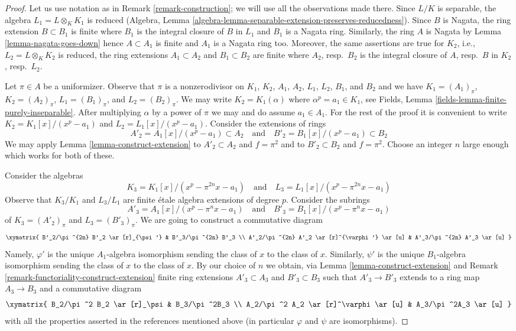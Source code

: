 \begin{proof}
Let us use notation as in Remark \ref{remark-construction}; we will use all
the observations made there. Since $L/K$ is separable, the algebra
$L_1 = L \otimes_K K_1$ is reduced
(Algebra, Lemma \ref{algebra-lemma-separable-extension-preserves-reducedness}).
Since $B$ is Nagata, the ring extension $B \subset B_1$ is finite
where $B_1$ is the integral closure of $B$ in $L_1$
and $B_1$ is a Nagata ring. Similarly, the ring $A$ is Nagata by
Lemma \ref{lemma-nagata-goes-down} hence $A \subset A_1$ is finite
and $A_1$ is a Nagata ring too. Moreover, the same assertions are true
for $K_2$, i.e., $L_2 = L \otimes_K K_2$ is reduced,
the ring extensions $A_1 \subset A_2$ and $B_1 \subset B_2$
are finite where $A_2$, resp.\ $B_2$ is the integral closure of
$A$, resp.\ $B$ in $K_2$, resp.\ $L_2$.

\medskip\noindent
Let $\pi \in A$ be a uniformizer. Observe that $\pi$ is a nonzerodivisor
on $K_1$, $K_2$, $A_1$, $A_2$, $L_1$, $L_2$, $B_1$, and $B_2$ and we have
$K_1 = (A_1)_\pi$, $K_2 = (A_2)_\pi$, $L_1 = (B_1)_\pi$, and $L_2 = (B_2)_\pi$.
We may write $K_2 = K_1(\alpha)$ where $\alpha^p = a_1 \in K_1$, see
Fields, Lemma \ref{fields-lemma-finite-purely-inseparable}.
After multiplying $\alpha$ by a power of $\pi$ we may and do assume
$a_1 \in A_1$. For the rest of the proof it is convenient to write
$K_2 = K_1[x]/(x^p - a_1)$ and $L_2 = L_1[x]/(x^p - a_1)$.
Consider the extensions of rings
$$
A'_2 = A_1[x]/(x^p - a_1) \subset A_2
\quad\text{and}\quad
B'_2 = B_1[x]/(x^p - a_1) \subset B_2
$$
We may apply Lemma \ref{lemma-construct-extension} to
$A'_2 \subset A_2$ and $f = \pi^2$ and to $B'_2 \subset B_2$ and $f = \pi^2$.
Choose an integer $n$ large enough which works for both of these.

\medskip\noindent
Consider the algebras
$$
K_3 = K_1[x]/(x^p - \pi^{2n} x - a_1)
\quad\text{and}\quad
L_3 = L_1[x]/(x^p - \pi^{2n} x - a_1)
$$
Observe that $K_3/K_1$ and $L_3/L_1$ are finite \'etale algebra extensions of
degree $p$. Consider the subrings
$$
A'_3 = A_1[x]/(x^p - \pi^n x - a_1)
\quad\text{and}\quad
B'_3 = B_1[x]/(x^p - \pi^n x - a_1)
$$
of $K_3 = (A'_2)_\pi$ and $L_3 = (B'_3)_\pi$. We are going to construct
a commutative diagram
$$
\xymatrix{
B'_2/\pi^{2n} B'_2 \ar[r]_{\psi'} & B'_3/\pi^{2n} B'_3 \\
A'_2/\pi^{2n} A'_2 \ar[r]^{\varphi'} \ar[u] & A'_3/\pi^{2n} A'_3 \ar[u]
}
$$
Namely, $\varphi'$ is the unique $A_1$-algebra isomorphism
sending the class of $x$ to the class of $x$.
Similarly, $\psi'$ is the unique $B_1$-algebra isomorphism sending
the class of $x$ to the class of $x$. By our choice of $n$ we obtain, via
Lemma \ref{lemma-construct-extension} and
Remark \ref{remark-functoriality-construct-extension}
finite ring extensions $A'_3 \subset A_3$ and $B'_3 \subset B_3$
such that $A'_3 \to B'_3$ extends to a ring map $A_3 \to B_3$
and a commutative diagram
$$
\xymatrix{
B_2/\pi^2 B_2 \ar[r]_\psi & B_3/\pi^2B_3 \\
A_2/\pi^2 A_2 \ar[r]^\varphi \ar[u] & A_3/\pi^2A_3 \ar[u]
}
$$
with all the properties asserted in the references mentioned above
(in particular $\varphi$ and $\psi$ are isomorphisms).


\end{proof}
